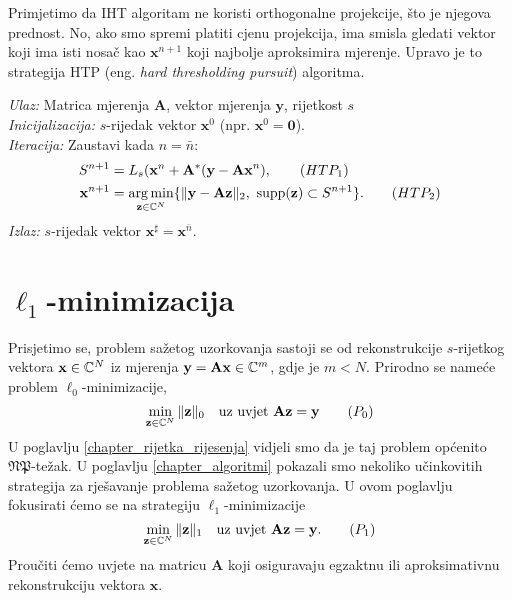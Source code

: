 \documentclass[a4paper,twoside,12pt]{memoir} %
\newcommand{\vect}[1]{\mathbf{#1}}
\renewcommand{\vec}{\vect}
\newcommand{\supp}{\text{\normalfont{supp}}}
\newcommand{\norm}[1]{\|{#1}\|}
\DeclareMathOperator*{\argmin}{arg\,min}
\newenvironment{alg}[1]
{
    \bigskip
    \begin{tcolorbox}[arc=0mm,boxrule=1.2pt,colframe=black,colback=white,detach title, before upper={\medskip\begin{center}\textbf{#1}\end{center}\hline\newline\medskip},frame hidden]
    \medskip
}
{
    \medskip
\end{tcolorbox}
    \bigskip
}
\begin{document}
Primjetimo da IHT algoritam ne koristi orthogonalne projekcije, \v{s}to je njegova prednost. No, ako smo spremi platiti cjenu projekcija, ima smisla gledati vektor koji ima isti nosa\v{c} kao $\vec x^{n+1}$ koji najbolje aproksimira mjerenje. Upravo je to strategija HTP (eng. \textit{hard thresholding pursuit}) algoritma.

\begin{alg}{HTP}
    \textit{Ulaz:} Matrica mjerenja $\vec A$, vektor mjerenja $\vec y$, rijetkost $s$ \\
    \textit{Inicijalizacija:} $s$-rijedak vektor $\vec x^0$ (npr. $\vec x^0 = \vec 0$).\\
    \textit{Iteracija:} Zaustavi kada $n = \bar{n}$:
        \begin{align*}
            S^{n+1} &= L_s(\vec x^n + \vec A^* (\vec y - \vec{Ax}^n),\tag{$HTP_1$}\label{htp_1}\\
            \vec x^{n+1} &= \argmin_{\vec z \in \C^N}\{ \norm{\vec y - \vec{Az}}_2,\ \supp(\vec z) \subset S^{n+1} \}.\tag{$HTP_2$}\label{htp_2}
        \end{align*}
        \textit{Izlaz:} $s$-rijedak vektor $\vec x^{\sharp}=\vec x^{\bar n}$.
\end{alg}





\chapter[$\ell_1$-minimizacija][$\ell_1$-minimizacija]{$\ell_1$-minimizacija}
Prisjetimo se, problem sa\v{z}etog uzorkovanja sastoji se od rekonstrukcije $s$-rijetkog vektora $\vec x \in \C^N$ iz mjerenja $\vec y = \vec{Ax} \in \C^m$, gdje je $m < N$. Prirodno se name\'ce problem $\ell_0$-minimizacije,
\noindent
\begin{equation}
\min_{\vec z \in \C^N} \norm{\vec z}_0\quad \text{uz uvjet }\vec{Az} = \vec{y}\tag{$P_0$}
\end{equation}
U poglavlju \eqref{chapter_rijetka_rijesenja} vidjeli smo da je taj problem op\'cenito $\mathfrak{NP}$-te\v{z}ak. U poglavlju \eqref{chapter_algoritmi} pokazali smo nekoliko u\v{c}inkovitih strategija za rje\v{s}avanje problema sa\v{z}etog uzorkovanja. U ovom poglavlju fokusirati \'cemo se na strategiju $\ell_1$-minimizacije
\begin{equation}
    \min_{\vec z \in \C^N} \norm{\vec z}_1 \quad \text{uz uvjet }\vec{Az}=\vec y.\tag{$P_1$}
\end{equation}
Prou\v{c}iti \'{c}emo uvjete na matricu $\vec A$ koji osiguravaju egzaktnu ili aproksimativnu rekonstrukciju vektora $\vec x$.
\end{document}
